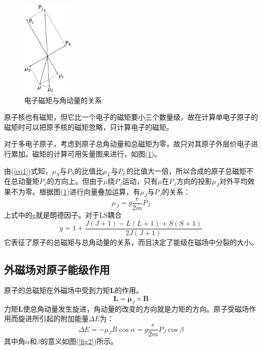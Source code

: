 \documentclass[a4paper]{article}
\begin{document}
\begin{figure}
\includegraphics[width=0.22\textwidth]{fig/fig1.pdf}
\caption{电子磁矩与角动量的关系}\label{fig1}
\end{figure}

原子核也有磁矩，但它比一个电子的磁矩要小三个数量级，故在计算单电子原子的磁矩时可以把原予核的磁矩忽略，只计算电子的磁矩。

对于多电子原子，考虑到原子总角动量和总磁矩为零，故只对其原子外层价电子进行累加。磁矩的计算可用矢量图来进行，如图(\ref{fig1})。

由(\ref{eq1})式知，$\mu_S$与$P_S$的比值比$\mu_L$与$P_L$的比值大一倍，所以合成的原子总磁矩不在总动量矩$P_J$的方向上。但由于$\mu$绕$P_J$运动，只有$\mu$在$P_J$方向的投影$\mu_J$对外平均效果不为零。根据图(\ref{fig1})进行向量叠加运算，有$\mu_J$与$P_J$的关系：
\begin{equation*}
\mu_J = g\frac{e}{2m}P_J
\end{equation*}
上式中的g就是朗德因子。对于LS耦合
\begin{equation}
g = 1+\frac{J(J+1)-L(L+1)+S(S+1)}{2J(J+1)}\label{eq2}
\end{equation}
它表征了原子的总磁矩与总角动量的关系，而且决定了能级在磁场中分裂的大小。
\subsection{外磁场对原子能级作用}
原子的总磁矩在外磁场中受到力矩$\mathbf{L}$的作用。
\begin{equation}
\mathbf{L} = \bm{\mu}_J\times\mathbf{B}\label{eq3}
\end{equation}
力矩$\mathbf{L}$使总角动量发生旋进，角动量的改变的方向就是力矩的方向。原子受磁场作用而旋进所引起的附加能量$\Delta E$为：
\begin{equation}
\Delta E = -\mu_JB\cos\alpha = g\frac{e}{2m}P_J\cos\beta\label{eq4}
\end{equation}
其中角$\alpha$和$\beta$的意义如图(\ref{fig2})所示。
\end{document}
